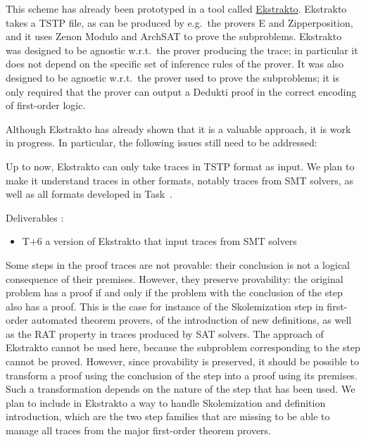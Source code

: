 \begin{workpackage}
\begin{tasklist}
\begin{task}[id=tracetodedukti, title=Translate ATP traces into Dedukti]
This scheme has already been prototyped in a tool called
\href{https://github.com/Deducteam/ekstrakto}{Ekstrakto}. Ekstrakto takes a TSTP
file, as can be produced by e.g.\ the provers E and Zipperposition, and it uses
Zenon Modulo and ArchSAT to prove the subproblems. Ekstrakto was designed to be
agnostic w.r.t.\ the prover producing the trace; in particular it does not
depend on the specific set of inference rules of the prover. It was also
designed to be agnostic w.r.t.\ the prover used to prove the subproblems; it is
only required that the prover can output a Dedukti proof in the correct encoding
of first-order logic.

Although Ekstrakto has already shown that it is a
valuable approach, it is work in progress. In particular, the
following issues still need to be addressed:

\begin{compactenum}
\item Up to now, Ekstrakto can only take traces in TSTP format as input. We plan
  to make it understand traces in other formats, notably traces from SMT
  solvers, as well as all formats developed in
  Task~.

  Deliverables :
  \begin{itemize}
  \item T+6 a version of Ekstrakto that input traces from SMT solvers
  \end{itemize}


\item  Some steps in the proof traces are not provable: their conclusion is
  not a logical consequence of their premises. However, they preserve
  provability: the original problem has a proof if and only if the
  problem with the conclusion of the step also has a proof. This is the
  case for instance of the Skolemization step in first-order automated
  theorem provers, of the introduction of new definitions, as well as
  the RAT property in traces produced by SAT solvers. The approach of
  Ekstrakto cannot be used here, because the subproblem corresponding to
  the step cannot be proved. However, since provability is preserved, it
  should be possible to transform a
  proof using the conclusion of the step into a proof using its
  premises. Such a transformation depends on the nature of the step that
  has been used. We plan to include in Ekstrakto a way to handle
  Skolemization and definition introduction, which are the two step
  families that are missing to be able to manage all traces from the
  major first-order theorem provers.


\end{compactenum}
\end{task}
\end{tasklist}
\end{workpackage}
